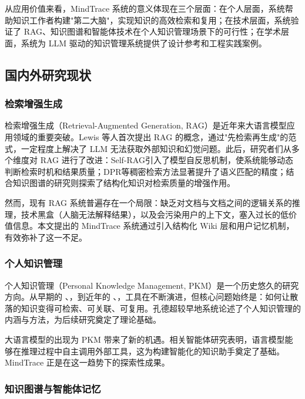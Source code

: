 从应用价值来看，MindTrace 系统的意义体现在三个层面：在个人层面，系统帮助知识工作者构建"第二大脑"，实现知识的高效检索和复用；在技术层面，系统验证了 RAG、知识图谱和智能体技术在个人知识管理场景下的可行性；在学术层面，系统为 LLM 驱动的知识管理系统提供了设计参考和工程实践案例。

\subsection{国内外研究现状}

\subsubsection{检索增强生成}

检索增强生成（Retrieval-Augmented Generation, RAG）是近年来大语言模型应用领域的重要突破。Lewis 等人\cite{lewis2020rag}首次提出 RAG 的概念，通过"先检索再生成"的范式，一定程度上解决了 LLM 无法获取外部知识和幻觉问题。此后，研究者们从多个维度对 RAG 进行了改进：Self-RAG\cite{asai2023selfrag}引入了模型自反思机制，使系统能够动态判断检索时机和结果质量；DPR\cite{karpukhin2020dpr}等稠密检索方法显著提升了语义匹配的精度；结合知识图谱的研究\cite{huang2019kgsurvey}则探索了结构化知识对检索质量的增强作用。

然而，现有 RAG 系统普遍存在一个局限：缺乏对文档与文档之间的逻辑关系的推理，技术黑盒（人脑无法解释结果），以及会污染用户的上下文，塞入过长的低价值信息。本文提出的 MindTrace 系统通过引入结构化 Wiki 层和用户记忆机制，有效弥补了这一不足。

\subsubsection{个人知识管理}

个人知识管理（Personal Knowledge Management, PKM）是一个历史悠久的研究方向。从早期的 、，到近年的 、，工具在不断演进，但核心问题始终是：如何让散落的知识变得可检索、可关联、可复用。孔德超\cite{kong2003pkm}较早地系统论述了个人知识管理的内涵与方法，为后续研究奠定了理论基础。

大语言模型的出现为 PKM 带来了新的机遇。相关智能体研究表明，语言模型能够在推理过程中自主调用外部工具\cite{yao2023react,schick2023toolformer}，这为构建智能化的知识助手奠定了基础。MindTrace 正是在这一趋势下的探索性成果。

\subsubsection{知识图谱与智能体记忆}

